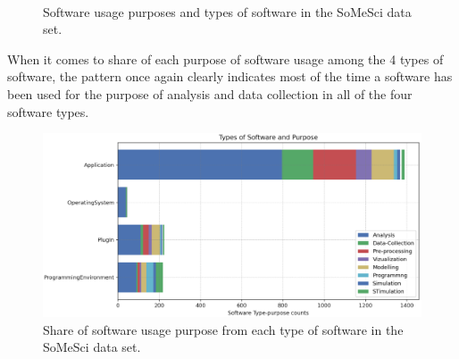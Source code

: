 \begin{figure}[h]
	\myfloatalign
	 \quad
	 \\
	\caption{Software usage purposes and types of software in the SoMeSci data set.}
	
\end{figure}


When it comes to share of each purpose of software usage among the 4 types of software, the pattern once again clearly indicates most of the time a software has been used for the purpose of analysis and data collection in all of the four software types. \\

\begin{figure}[htbp]
	\centering
	\includegraphics[width=.90\textwidth]{4.graphics/figures/ch_4/analysisresults/6.Types of Software and Purpose stacked bar}
	\caption{Share of software usage purpose from each type of software in the \ac{SoMeSci} data set.}
	\label{fig:chapter03:setup}
\end{figure}

